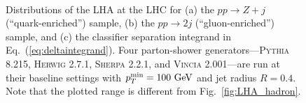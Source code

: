 \documentclass[11pt,letterpaper]{article}
\newcommand{\GeV}{\text{GeV}}
\DeclareRobustCommand{\Fig}[1]{Fig.~\ref{#1}}
\DeclareRobustCommand{\Eq}[1]{Eq.~(\ref{#1})}
\begin{document}
\begin{figure}
\centering
{}
$\qquad$

\caption{Distributions of the LHA at the LHC for (a) the $pp \to Z+j$
  (``quark-enriched'') sample, (b) the $pp \to 2j$
  (``gluon-enriched'') sample, and (c) the classifier separation
  integrand in \Eq{eq:deltaintegrand}.  Four parton-shower
  generators---\textsc{Pythia 8.215}, \textsc{Herwig 2.7.1},
  \textsc{Sherpa 2.2.1}, and \textsc{Vincia 2.001}---are run at their
  baseline settings with $p_T^{\rm min} = 100~\GeV$ and jet radius
  $R= 0.4$.  Note that the plotted range is different from
  \Fig{fig:LHA_hadron}.}
\label{fig:LHA_hadron_pp}
\end{figure}
\end{document}
